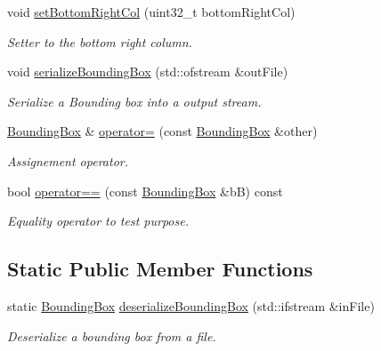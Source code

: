\begin{DoxyCompactItemize}
void \hyperlink{classfc_1_1BoundingBox_af24b7c088410245b0aa492cf0b200e2e}{set\+Bottom\+Right\+Col} (uint32\+\_\+t bottom\+Right\+Col)
\begin{DoxyCompactList}\small\item\em Setter to the bottom right column. \end{DoxyCompactList}\item 
void \hyperlink{classfc_1_1BoundingBox_ae2174abc444c26d86763567ed31c5094}{serialize\+Bounding\+Box} (std\+::ofstream \&out\+File)
\begin{DoxyCompactList}\small\item\em Serialize a Bounding box into a output stream. \end{DoxyCompactList}\item 
\hyperlink{classfc_1_1BoundingBox}{Bounding\+Box} \& \hyperlink{classfc_1_1BoundingBox_a80e775cb93499c77462ea281d9740f74}{operator=} (const \hyperlink{classfc_1_1BoundingBox}{Bounding\+Box} \&other)
\begin{DoxyCompactList}\small\item\em Assignement operator. \end{DoxyCompactList}\item 
bool \hyperlink{classfc_1_1BoundingBox_a2a1f28a0e0cd0a8b6041ba8e9c0f9b4f}{operator==} (const \hyperlink{classfc_1_1BoundingBox}{Bounding\+Box} \&bB) const
\begin{DoxyCompactList}\small\item\em Equality operator to test purpose. \end{DoxyCompactList}\end{DoxyCompactItemize}
\subsection*{Static Public Member Functions}
\begin{DoxyCompactItemize}
\item 
static \hyperlink{classfc_1_1BoundingBox}{Bounding\+Box} \hyperlink{classfc_1_1BoundingBox_acdd286d48651286d78c1b1eabe2357c9}{deserialize\+Bounding\+Box} (std\+::ifstream \&in\+File)
\begin{DoxyCompactList}\small\item\em Deserialize a bounding box from a file. \end{DoxyCompactList}\end{DoxyCompactItemize}
